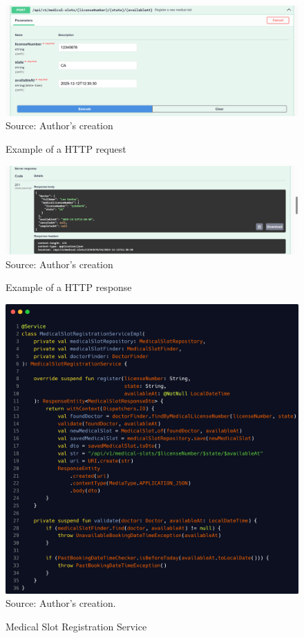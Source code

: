 \begin{figure}[H]
    \caption{Example of a HTTP request}
    \centering
    \includegraphics[width=1\linewidth]{figures/http_request.png}
    \label{fig:http-request}
    \footnotesize Source: Author's creation
\end{figure}

\begin{figure}[H]
    \caption{Example of a HTTP response}
    \centering
    \includegraphics[width=1\linewidth]{figures/http_response.png}
    \label{fig:http-response}
    \footnotesize Source: Author's creation
\end{figure}

 \begin{figure}[H]
    \centering
    \caption{Medical Slot Registration Service}
    \includegraphics[width=0.9\linewidth]{figures/medical_slot_registration_service.png}
    \label{fig:medical_slot_registration_service}
    \\ \footnotesize Source: Author's creation.
\end{figure}

